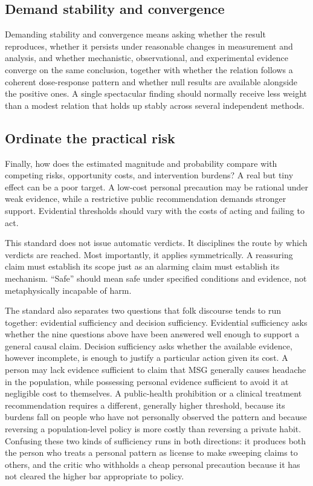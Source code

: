 \documentclass[11pt]{article}
\begin{document}
\subsection{Demand stability and convergence}

Demanding stability and convergence means asking whether the result reproduces, whether it persists under reasonable changes in measurement and analysis, and whether mechanistic, observational, and experimental evidence converge on the same conclusion, together with whether the relation follows a coherent dose-response pattern and whether null results are available alongside the positive ones. A single spectacular finding should normally receive less weight than a modest relation that holds up stably across several independent methods.

\subsection{Ordinate the practical risk}

Finally, how does the estimated magnitude and probability compare with competing risks, opportunity costs, and intervention burdens? A real but tiny effect can be a poor target. A low-cost personal precaution may be rational under weak evidence, while a restrictive public recommendation demands stronger support. Evidential thresholds should vary with the costs of acting and failing to act.

This standard does not issue automatic verdicts. It disciplines the route by which verdicts are reached. Most importantly, it applies symmetrically. A reassuring claim must establish its scope just as an alarming claim must establish its mechanism. ``Safe'' should mean safe under specified conditions and evidence, not metaphysically incapable of harm.

The standard also separates two questions that folk discourse tends to run together: evidential sufficiency and decision sufficiency. Evidential sufficiency asks whether the nine questions above have been answered well enough to support a general causal claim. Decision sufficiency asks whether the available evidence, however incomplete, is enough to justify a particular action given its cost. A person may lack evidence sufficient to claim that MSG generally causes headache in the population, while possessing personal evidence sufficient to avoid it at negligible cost to themselves. A public-health prohibition or a clinical treatment recommendation requires a different, generally higher threshold, because its burdens fall on people who have not personally observed the pattern and because reversing a population-level policy is more costly than reversing a private habit. Confusing these two kinds of sufficiency runs in both directions: it produces both the person who treats a personal pattern as license to make sweeping claims to others, and the critic who withholds a cheap personal precaution because it has not cleared the higher bar appropriate to policy.
\end{document}
